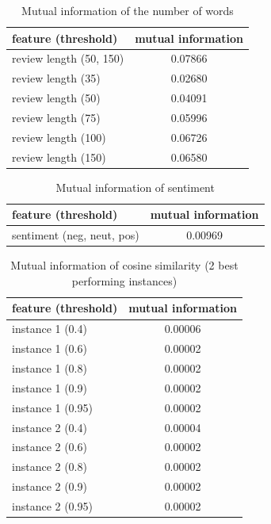 \begin{table}[h!]

\centering
\begin{tabular}{lS[table-format=3.2]}
\toprule
\textbf{feature (threshold)} & \textbf{mutual information} \\
\midrule
review length (50, 150) & 0.07866 \\
review length (35) & 0.02680 \\
review length (50) & 0.04091 \\
review length (75) & 0.05996 \\
review length (100) & 0.06726 \\
review length (150) & 0.06580 \\

\bottomrule
\end{tabular}
\caption{Mutual information of the number of words}\label{tab:mi_words}
\end{table}

\begin{table}[h!]
\centering
\begin{tabular}{lS[table-format=3.2]}
\toprule
\textbf{feature (threshold)} & \textbf{mutual information} \\
\midrule
sentiment (neg, neut, pos) & 0.00969 \\
\bottomrule
\end{tabular}
\caption{Mutual information of sentiment}\label{tab:mi_sentiment}
\end{table}



\begin{table}[h!]
\centering
\begin{tabular}{lS[table-format=3.2]}
\toprule
\textbf{feature (threshold)} & \textbf{mutual information} \\
\midrule
instance 1 (0.4) & 0.00006 \\
instance 1 (0.6) & 0.00002 \\
instance 1 (0.8) & 0.00002 \\
instance 1 (0.9) & 0.00002 \\
instance 1 (0.95) & 0.00002 \\
instance 2 (0.4) & 0.00004 \\
instance 2 (0.6) & 0.00002 \\
instance 2 (0.8) & 0.00002 \\
instance 2 (0.9) & 0.00002 \\
instance 2 (0.95) & 0.00002 \\
\bottomrule
\end{tabular}
\caption{Mutual information of cosine similarity (2 best performing instances)}\label{tab:mi_cossim}
\end{table}

